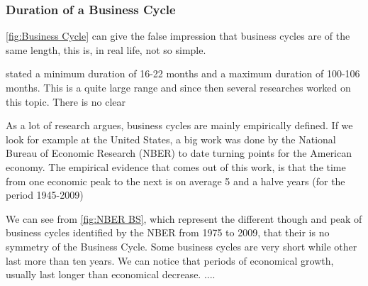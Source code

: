 \documentclass[12pt,a4paper,oneside]{book}
\begin{document}
\subsubsection{Duration of a Business Cycle}

\autoref{fig:Business Cycle} can give the false impression that business cycles are of the same length, this is, in real life, not so simple.

\cite{mitchell_measuring_1946} stated a minimum duration of 16-22 months and a maximum duration of 100-106 months. This is a quite large range and since then several researches worked on this topic. There is no clear 

As a lot of research argues, business cycles are mainly empirically defined. 
If we look for example at the United States, a big work was done by the National Bureau of Economic Research (NBER) to date turning points for the American economy. The empirical evidence that comes out of this work, is that the time from one economic peak to the next is on average 5 and a halve years (for the period 1945-2009)

We can see from \autoref{fig:NBER BS}, which represent the different though and peak of business cycles identified by the NBER from 1975 to 2009, that their is no symmetry of the Business Cycle. Some business cycles are very short while other last more than ten years.
We can notice that periods of economical growth, usually last longer than economical decrease. ....
\end{document}
